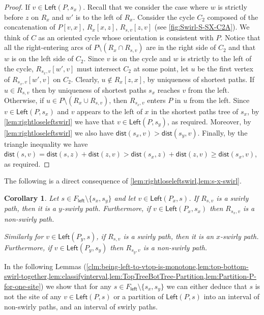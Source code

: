 \documentclass{article}
\newcommand{\Left}{\mathsf{Left}}
\newcommand{\leftside}{\mathsf{left}}
\newcommand{\dist}{\mathsf{dist}}
\newtheorem{corollary}{Corollary}
\begin{document}
\begin{proof}
If $v\in\Left(P,s_x)$.
Recall that we consider the case where $w$ is strictly before $z$ on $R_x$ and $w'$ is to the left of $R_x$.
Consider the cycle $C_2$ composed of the concatenation of $P[v,x]$, $R_x[x,z]$, $R_{s,v}[z,v]$ (see \cref{fig:Swirl-S-SX-C2A}).
We think of $C$ as an oriented cycle whose orientation is consistent with $P$.
Notice that all the right-entering arcs of $P\setminus (R_x\cap R_{s,v})$  are in the right side of $C_2$ and that $w$ is on the left side of $C_2$.
Since $v$ is on the cycle and $w$ is strictly to the left of the cycle, $R_{s_x,v}[w',v]$ must intersect $C_2$ at some point, let $u$ be the first vertex of $R_{s_x,v}[w',v]$ on $C_2$.
Clearly, $u\notin R_x[z,x]$, by uniqueness of shortest paths.
If $u\in R_{s,v}$ then by uniqueness of shortest paths $s_x$ reaches $v$ from the left.
Otherwise, if $u\in P\setminus (R_x\cup R_{s,v})$, then $R_{s_x,v}$ enters $P$ in $u$ from the left.
Since $v\in\Left(P,s_x)$ and $v$ appears to the left of $x$ in the shortest paths tree of $s_x$, by \cref{lem:rightloseleftswirl} we have that $v\in\Left(P,s_y)$, as required.
Moreover, by \cref{lem:rightloseleftswirl} we also have $\dist(s_x,v)>\dist(s_y,v)$.
Finally, by the triangle inequality we have $\dist(s,v)=\dist(s,z)+\dist(z,v)>\dist(s_x,z)+\dist(z,v)\ge \dist(s_x,v)$, as required.
\qedhere


\end{proof}


The following is a direct consequence of \cref{lem:rightloseleftswirl,lem:s-x-swirl}.

\begin{corollary}\label{cor:Px-not-x-swirly}
Let $s\in F_{\leftside}\setminus\{s_x,s_y\}$ and let $v\in \Left(P_x,s)$.
If $R_{s,v}$ is a swirly path, then it is a $y$-swirly path.
Furthermore, if $v\in \Left(P_x,s_x)$ then $R_{s_x,v}$ is a non-swirly path.

Similarly for $v\in \Left(P_y,s)$, if $R_{s,v}$ is a swirly path, then it is an $x$-swirly path.
Furthermore, if $v\in \Left(P_y,s_y)$ then $R_{s_y,v}$ is a non-swirly path.
\end{corollary}




















In the following Lemmas (\cref{clm:being-left-to-vtop-is-monotone,lem:top-bottom-swirl-together,lem:classifyinterval,lem:TopTreeBotTree-Partition,lem:Partition-P-for-one-site}) we show that for any $s\in F_{\leftside}\setminus\{s_x,s_y\}$ we can either deduce that $s$ is not the site of any $v\in\Left(P,s)$ or a partition of $\Left(P,s)$ into an interval of non-swirly paths, and an interval of swirly paths.
\end{document}
